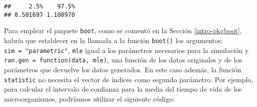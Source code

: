 \documentclass[]{book}
\newenvironment{Shaded}{\begin{snugshade}}{\end{snugshade}}
\newcommand{\KeywordTok}[1]{\textcolor[rgb]{0.13,0.29,0.53}{\textbf{#1}}}
\newcommand{\DecValTok}[1]{\textcolor[rgb]{0.00,0.00,0.81}{#1}}
\newcommand{\StringTok}[1]{\textcolor[rgb]{0.31,0.60,0.02}{#1}}
\newcommand{\OperatorTok}[1]{\textcolor[rgb]{0.81,0.36,0.00}{\textbf{#1}}}
\newcommand{\NormalTok}[1]{#1}
\theoremstyle{break}
\theoremstyle{definition}
\theoremstyle{definition}
\theoremstyle{definition}
\theoremstyle{remark}
\begin{document}
\begin{Shaded}
\end{Shaded}

\begin{verbatim}
##     2.5%    97.5% 
## 0.501697 1.108970
\end{verbatim}

Para emplear el paquete \texttt{boot}, como se comentó en la Sección
\ref{intro-pkgboot}, habría que establecer en la llamada a la función
\texttt{boot()} los argumentos: \texttt{sim\ =\ "parametric"},
\texttt{mle} igual a los parámetros necesarios para la simulación y
\texttt{ran.gen\ =\ function(data,\ mle)}, una función de los datos
originales y de los parámetros que devuelve los datos generados. En este
caso además, la función \texttt{statistic} no necesita el vector de
índices como segundo parámetro. Por ejemplo, para calcular el intervalo
de confianza para la media del tiempo de vida de los microorganismos,
podríamos utilizar el siguiente código:
\end{document}
